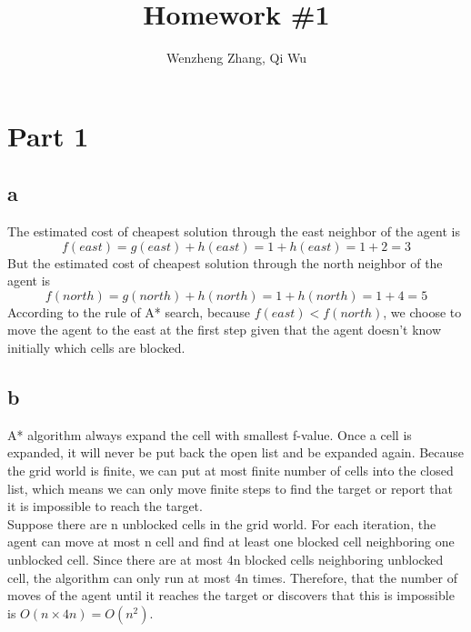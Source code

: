 \documentclass[11pt]{article}
\title{Homework \#1} %
\author{Wenzheng Zhang, Qi Wu} %
\begin{document}
\maketitle %


\section*{Part 1}





\subsection*{a}
 The estimated cost of cheapest solution through the east neighbor of the agent is
 $$f(east)=g(east)+h(east)=1+h(east)=1+2=3$$ 
 But the estimated cost of cheapest solution through the north neighbor of the agent is $$f(north)=g(north)+h(north)=1+h(north)=1+4=5$$ 
 According to the rule of A* search, because $f(east)<f(north)$, we choose to move the agent to  the east at the first step given that the agent doesn't know initially which cells are blocked.


\subsection*{b}
 A* algorithm always expand the cell with smallest f-value. Once a cell is expanded, it will never be put back the open list and be expanded again. Because the grid world is finite, we can put at most finite number of cells into the closed list, which means we can only move finite steps to find the target or report that it is impossible to reach the target.\\
 Suppose there are n unblocked cells in the grid world. For each iteration, the agent can move at most n cell and find at least one blocked cell neighboring one unblocked cell. Since there are at most 4n blocked cells neighboring unblocked cell, the algorithm can only run at most 4n times. Therefore, that the number of moves of the agent until it reaches the target or discovers that this is impossible is $O(n\times 4n)=O(n^2)$.
\end{document}
